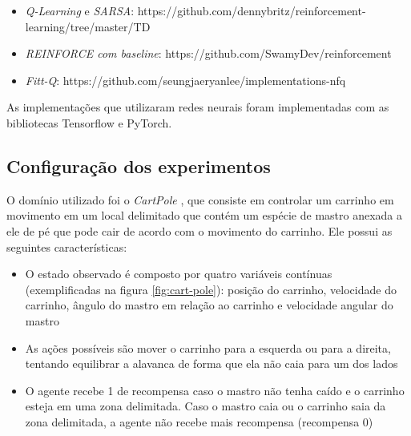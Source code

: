 \documentclass[letterpaper]{article}
\begin{document}
\begin{itemize}
  \item \textit{Q-Learning} e \textit{SARSA}: https://github.com/dennybritz/reinforcement-learning/tree/master/TD
  \item \textit{REINFORCE com baseline}: https://github.com/SwamyDev/reinforcement
  \item \textit{Fitt-Q}: https://github.com/seungjaeryanlee/implementations-nfq
\end{itemize}

As implementações que utilizaram redes neurais foram implementadas com as bibliotecas Tensorflow e PyTorch.

\subsection{Configuração dos experimentos}

O domínio utilizado foi o \textit{CartPole} \cite{SuttonBarto-2018}, que consiste em controlar um carrinho em movimento em um local delimitado que contém um espécie de mastro anexada a ele de pé que pode cair de acordo com o movimento do carrinho. Ele possui as seguintes características:

\begin{itemize}
  \item O estado observado é composto por quatro variáveis contínuas (exemplificadas na figura \ref{fig:cart-pole}): posição do carrinho, velocidade do carrinho, ângulo do mastro em relação ao carrinho e velocidade angular do mastro
  \item As ações possíveis são mover o carrinho para a esquerda ou para a direita, tentando equilibrar a alavanca de forma que ela não caia para um dos lados
  \item O agente recebe 1 de recompensa caso o mastro não tenha caído e o carrinho esteja em uma zona delimitada. Caso o mastro caia ou o carrinho saia da zona delimitada, a agente não recebe mais recompensa (recompensa 0)
\end{itemize}
\end{document}
